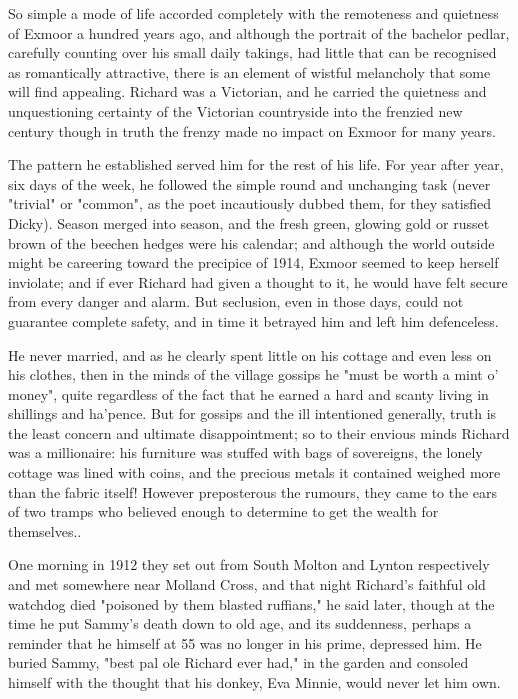 So simple a mode of life accorded completely with the remoteness and quietness of Exmoor a hundred years ago, and although the portrait of the bachelor pedlar, carefully counting over his small daily takings, had little that can be recognised as romantically attractive, there is an element of wistful melancholy that some will find appealing. Richard was a Victorian, and he carried the quietness and unquestioning certainty of the Victorian countryside into the frenzied new century   though in truth the frenzy made no impact on Exmoor for many years.

The pattern he established served him for the rest of his life. For year after year, six days of the week, he followed the simple round and unchanging task (never "trivial" or "common", as the poet incautiously dubbed them, for they satisfied Dicky). Season merged into season, and the fresh green, glowing gold or russet brown of the beechen hedges were his calendar; and although the world outside might be careering toward the precipice of 1914, Exmoor seemed to keep herself inviolate; and if ever Richard had given a thought to it, he would have felt secure from every danger and alarm. But seclusion, even in those days, could not guarantee complete safety, and in time it betrayed him and left him defenceless.

He never married, and as he clearly spent little on his cottage and even less on his clothes, then in the minds of the village gossips he "must be worth a mint o' money", quite regardless of the fact that he earned a hard and scanty living in shillings and ha'pence.   But for gossips and the ill intentioned generally, truth is the least concern and ultimate disappointment; so to their envious minds Richard was a millionaire: his furniture was stuffed with bags of sovereigns, the lonely cottage was lined with coins, and the precious metals it contained weighed more than the fabric itself! However preposterous the rumours, they came to the ears of two tramps who believed enough to determine to get the wealth for themselves..

One morning in 1912 they set out from South Molton and Lynton respectively and met somewhere near Molland Cross, and that night Richard's faithful old watchdog died  "poisoned by them blasted ruffians," he said later, though at the time he put Sammy's death down to old age, and its suddenness, perhaps a reminder that he himself at 55 was no longer in his prime, depressed him. He buried Sammy, "best pal ole Richard ever had," in the garden and consoled himself with the thought that his donkey, Eva Minnie, would never let him own.

